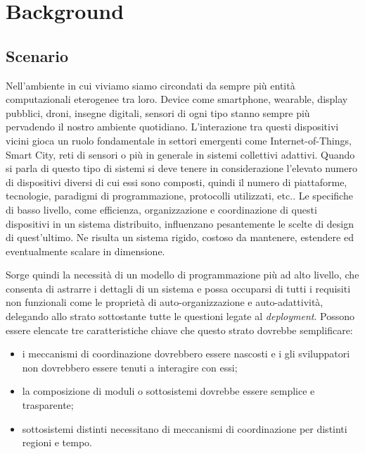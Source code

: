 \chapter{Background}
\section{Scenario}
Nell'ambiente in cui viviamo siamo circondati da sempre più entità
computazionali eterogenee tra loro. Device come smartphone, wearable, display
pubblici, droni, insegne digitali, sensori di ogni tipo stanno sempre più
pervadendo il nostro ambiente quotidiano. L'interazione tra questi dispositivi
vicini gioca un ruolo fondamentale in settori emergenti come Internet-of-Things,
Smart City, reti di sensori o più in generale in sistemi collettivi
adattivi. Quando si parla di questo tipo di sistemi si deve tenere in
considerazione l'elevato numero di dispositivi diversi di cui essi sono
composti, quindi il numero di piattaforme, tecnologie, paradigmi di
programmazione, protocolli utilizzati, etc.. Le specifiche di basso livello, come
efficienza, organizzazione e coordinazione di questi dispositivi in un sistema
distribuito, influenzano pesantemente le scelte di design di quest'ultimo. Ne
risulta un sistema rigido, costoso da mantenere, estendere ed eventualmente
scalare in dimensione.

Sorge quindi la necessità di un modello di programmazione più ad alto livello,
che consenta di astrarre i dettagli di un sistema e possa occuparsi di tutti i
requisiti non funzionali come le proprietà di auto-organizzazione e
auto-adattività, delegando allo strato sottostante tutte le questioni legate al
\textit{deployment}. Possono essere elencate tre caratteristiche
chiave che questo strato dovrebbe semplificare\cite{DBLP:journals/computer/BealPV15
}:
\begin{itemize}
\item i meccanismi di coordinazione dovrebbero essere nascosti e i gli
  sviluppatori non dovrebbero essere tenuti a interagire con essi;
\item la composizione di moduli o sottosistemi dovrebbe essere semplice e
  trasparente;
\item sottosistemi distinti necessitano di meccanismi di coordinazione per distinti
regioni e tempo.
\end{itemize}


